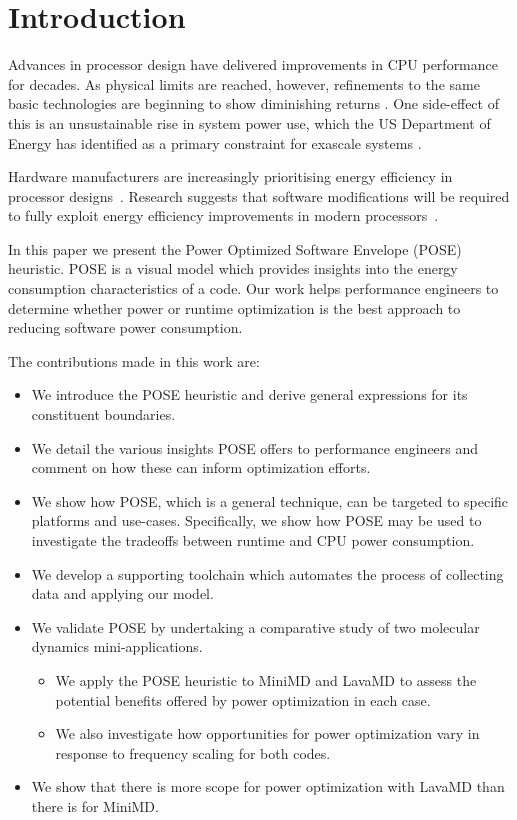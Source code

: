 \section{Introduction}
Advances in processor design have delivered improvements in CPU performance for decades. As physical limits are reached, however, refinements to the same basic technologies are beginning to show diminishing returns \cite{esmaeilzadeh:2011aa}. One side-effect of this is an unsustainable rise in system power use, which the US Department of Energy has identified as a primary constraint for exascale systems \cite{shalf:2011aa}.

Hardware manufacturers are increasingly prioritising energy efficiency in processor designs~\cite{kurd:2014aa}. 
Research suggests that software modifications will be required to fully exploit energy efficiency improvements in modern processors~\cite{shao:2013aa}. 

In this paper we present the Power Optimized Software Envelope (POSE) heuristic.
POSE is a visual model which provides insights into the energy consumption characteristics of a code.
Our work helps performance engineers to determine whether power or runtime optimization is the best approach to reducing software power consumption.

The contributions made in this work are:
\begin{itemize}
  \item We introduce the POSE heuristic and derive general expressions for its constituent boundaries.
  \item We detail the various insights POSE offers to performance engineers and comment on how these can inform optimization efforts.
  \item We show how POSE, which is a general technique, can be targeted to specific platforms and use-cases. 
  Specifically, we show how POSE may be used to investigate the tradeoffs between runtime and CPU power consumption.
  \item We develop a supporting toolchain which automates the process of collecting data and applying our model. 
  \item We validate POSE by undertaking a comparative study of two molecular dynamics mini-applications.
    \begin{itemize}
      \item We apply the POSE heuristic to MiniMD and LavaMD to assess the potential benefits offered by power optimization in each case.
      \item We also investigate how opportunities for power optimization vary in response to frequency scaling for both codes.
    \end{itemize}
  \item We show that there is more scope for power optimization with LavaMD than there is for MiniMD.
\end{itemize}

